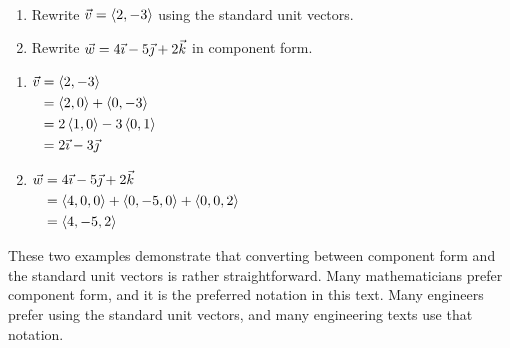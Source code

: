 \begin{example}\label{ex_vect7}%
\mbox{}\\[-2\baselineskip]\parbox[t]{\linewidth}{%
\begin{enumerate}
	\item Rewrite $\vec v =\left\langle 2,-3\right\rangle$ using the standard unit vectors.
	\item	Rewrite $\vec w = 4\vec\imath - 5\vec\jmath +2\vec k$ in component form.
\end{enumerate}}\vspace{0pt}
\solution
\begin{enumerate}
	\item  \hfill$\begin{aligned}[t]
		\vec v &=\left\langle 2,-3\right\rangle\\
		&=\left\langle 2,0\right\rangle+\left\langle 0,-3\right\rangle\\
		&= 2\left\langle 1,0\right\rangle-3\left\langle 0,1\right\rangle\\
		&= 2\vec\imath - 3\vec\jmath
	\end{aligned}$\hfill\null
	
	\item	\hfill$\begin{aligned}[t]
		\vec w &= 4\vec\imath - 5\vec\jmath +2\vec k\\
		&=\left\langle 4,0,0\right\rangle+\left\langle 0,-5,0\right\rangle+\left\langle 0,0,2\right\rangle\\
		&=\left\langle 4,-5,2\right\rangle
	\end{aligned}$\hfill\null
\end{enumerate}
These two examples demonstrate that converting between component form and the standard unit vectors is rather straightforward. Many mathematicians prefer component form, and it is the preferred notation in this text. Many engineers prefer using the standard unit vectors, and many engineering texts use that notation.
\end{example}

